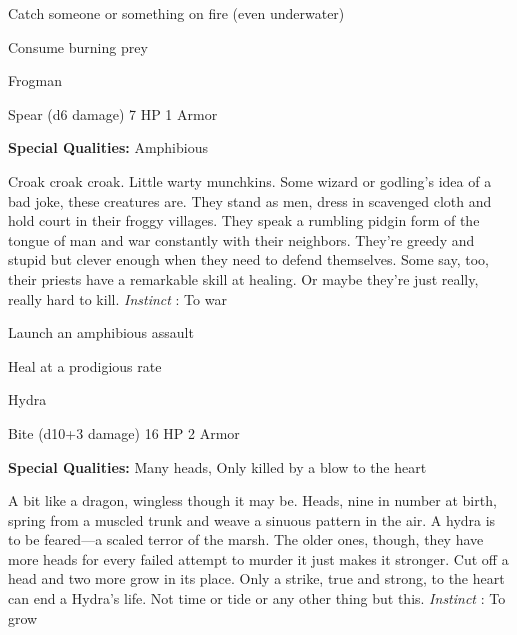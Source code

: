\startitemize[1,packed]

\item Catch someone or something on fire (even underwater)

 
\item Consume burning prey


\stopitemize
 
\startMonsterName
Frogman	 
\stopMonsterName
 

Spear (d6 damage)	7 HP	1 Armor

 


 
\startMonsterQualities
{\bf Special Qualities:}  Amphibious
\stopMonsterQualities
 
\startMonsterDescription
Croak croak croak. Little warty munchkins. Some wizard or godling’s idea of a bad joke, these creatures are. They stand as men, dress in scavenged cloth and hold court in their froggy villages. They speak a rumbling pidgin form of the tongue of man and war constantly with their neighbors. They’re greedy and stupid but clever enough when they need to defend themselves. Some say, too, their priests have a remarkable skill at healing. Or maybe they’re just really, really hard to kill. {\em Instinct} : To war
\stopMonsterDescription
 
\startitemize[1,packed]

\item Launch an amphibious assault

 
\item Heal at a prodigious rate


\stopitemize
 
\startMonsterName
Hydra	 
\stopMonsterName
 

Bite (d10+3 damage)	16 HP	2 Armor

 


 
\startMonsterQualities
{\bf Special Qualities:}  Many heads, Only killed by a blow to the heart
\stopMonsterQualities
 
\startMonsterDescription
A bit like a dragon, wingless though it may be. Heads, nine in number at birth, spring from a muscled trunk and weave a sinuous pattern in the air. A hydra is to be feared—a scaled terror of the marsh. The older ones, though, they have more heads for every failed attempt to murder it just makes it stronger. Cut off a head and two more grow in its place. Only a strike, true and strong, to the heart can end a Hydra’s life. Not time or tide or any other thing but this. {\em Instinct} : To grow
\stopMonsterDescription
 
